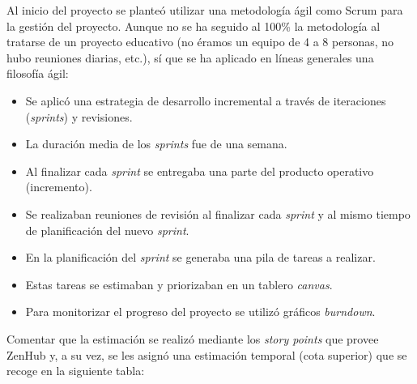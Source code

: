 Al inicio del proyecto se planteó utilizar una metodología ágil como
Scrum para la gestión del proyecto. Aunque no se ha seguido al 100\% la
metodología al tratarse de un proyecto educativo (no éramos un equipo de
4 a 8 personas, no hubo reuniones diarias, etc.), sí que se ha aplicado
en líneas generales una filosofía ágil:

\begin{itemize}
\tightlist
\item
  Se aplicó una estrategia de desarrollo incremental a través de
  iteraciones (\emph{sprints}) y revisiones.
\item
  La duración media de los \emph{sprints} fue de una semana.
\item
  Al finalizar cada \emph{sprint} se entregaba una parte del producto
  operativo (incremento).
\item
  Se realizaban reuniones de revisión al finalizar cada \emph{sprint} y
  al mismo tiempo de planificación del nuevo \emph{sprint}.
\item
  En la planificación del \emph{sprint} se generaba una pila de tareas a
  realizar.
\item
  Estas tareas se estimaban y priorizaban en un tablero \emph{canvas}.
\item
  Para monitorizar el progreso del proyecto se utilizó gráficos
  \emph{burndown}.
\end{itemize}

Comentar que la estimación se realizó mediante los \emph{story points}
que provee ZenHub y, a su vez, se les asignó una estimación temporal
(cota superior) que se recoge en la siguiente tabla:

